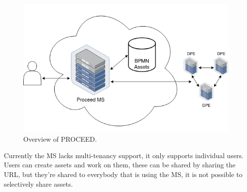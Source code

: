 \begin{figure}[H]
    \centering
    \includegraphics[scale=0.45]{images/quick-ms-overview.drawio.png}
    \caption{Overview of PROCEED.}
    \label{fig:proceed-overview}
\end{figure}



Currently the MS lacks multi-tenancy support, it only supports individual users.
Users can create assets and work on them, these can be shared by sharing the URL, but
they're shared to everybody that is using the MS, it is not possible to selectively share
assets.


